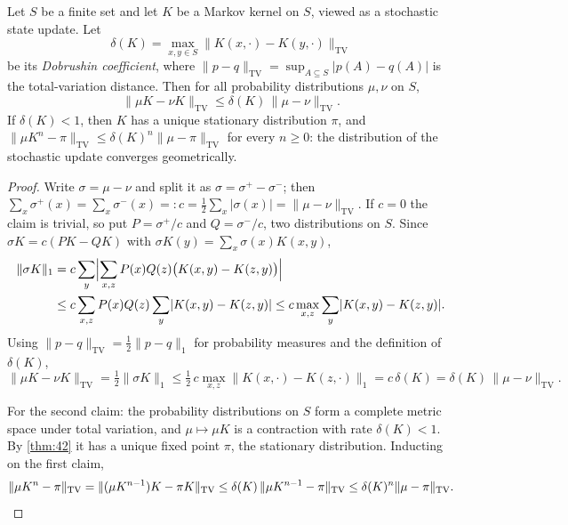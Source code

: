 \begin{theorem}\label{thm:45}
Let $S$ be a finite set and let $K$ be a Markov kernel on $S$, viewed as a stochastic state update. Let
\[ \delta (K) = \max_{x,y \in S} \lVert K (x,\cdot) - K (y,\cdot) \rVert_{\mathrm{TV}} \]
be its \emph{Dobrushin coefficient}, where $\lVert p - q \rVert_{\mathrm{TV}} = \sup_{A \subseteq S} \lvert p (A) - q (A) \rvert$ is the total-variation distance. Then for all probability distributions $\mu,\nu$ on $S$,
\[ \lVert \mu K - \nu K \rVert_{\mathrm{TV}} \leq \delta (K)\,\lVert \mu - \nu \rVert_{\mathrm{TV}} . \]
If $\delta (K) < 1$, then $K$ has a unique stationary distribution $\pi$, and $\lVert \mu K^n - \pi \rVert_{\mathrm{TV}} \leq \delta (K)^n \lVert \mu - \pi \rVert_{\mathrm{TV}}$ for every $n \geq 0$: the distribution of the stochastic update converges geometrically.
\end{theorem}

\begin{proof}
Write $\sigma = \mu - \nu$ and split it as $\sigma = \sigma^+ - \sigma^-$; then $\sum_x \sigma^+(x) = \sum_x \sigma^-(x) =: c = \tfrac12 \sum_x \lvert \sigma (x) \rvert = \lVert \mu - \nu \rVert_{\mathrm{TV}}$. If $c = 0$ the claim is trivial, so put $P = \sigma^+/c$ and $Q = \sigma^-/c$, two distributions on $S$. Since $\sigma K = c (PK - QK)$ with $\sigma K (y) = \sum_x \sigma (x) K (x,y)$,
\begin{align*}
\lVert \sigma K \rVert_1 &= c \sum_y \Bigl\lvert \sum_{x,z} P (x) Q (z)\bigl (K (x,y) - K (z,y)\bigr) \Bigr\rvert \\
&\leq c \sum_{x,z} P (x) Q (z) \sum_y \lvert K (x,y) - K (z,y) \rvert \leq c \max_{x,z} \sum_y \lvert K (x,y) - K (z,y) \rvert .
\end{align*}
Using $\lVert p - q \rVert_{\mathrm{TV}} = \tfrac12 \lVert p - q \rVert_1$ for probability measures and the definition of $\delta (K)$,
\[ \lVert \mu K - \nu K \rVert_{\mathrm{TV}} = \tfrac12 \lVert \sigma K \rVert_1 \leq \tfrac12\, c \max_{x,z} \lVert K (x,\cdot) - K (z,\cdot) \rVert_1 = c\,\delta (K) = \delta (K)\,\lVert \mu - \nu \rVert_{\mathrm{TV}}. \]

For the second claim: the probability distributions on $S$ form a complete metric space under total variation, and $\mu \mapsto \mu K$ is a contraction with rate $\delta (K) < 1$. By \autoref{thm:42} it has a unique fixed point $\pi$, the stationary distribution. Inducting on the first claim,
\[ \lVert \mu K^n - \pi \rVert_{\mathrm{TV}} = \lVert (\mu K^{n-1}) K - \pi K \rVert_{\mathrm{TV}} \leq \delta (K)\,\lVert \mu K^{n-1} - \pi \rVert_{\mathrm{TV}} \leq \delta (K)^n \lVert \mu - \pi \rVert_{\mathrm{TV}}. \qedhere \]
\end{proof}

